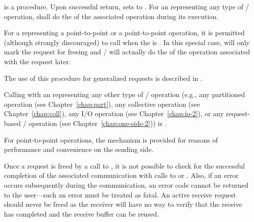  is a  procedure. Upon successful return,
 sets  to .
For an   representing any type of \MPI/ operation,
 shall do the  of the associated
operation during its execution.

For a  representing a  point-to-point
or a  point-to-point operation, it is permitted (although
strongly discouraged) to call  when the
 is . In this special case, 
will only mark the request for freeing and \MPI/ will actually do the
 of the operation associated with the request later.

The use of this procedure for generalized requests is described in
.

Calling  with an   representing any
other type of \MPI/ operation (e.g., any partitioned operation (see Chapter~\ref{chap:part}),
any collective operation (see Chapter~\ref{chap:coll}), any I/O
operation (see Chapter~\ref{chap:io-2}), or any
request-based \RMA/ operation (see Chapter~\ref{chap:one-side-2})) is .

\begin{rationale}
For point-to-point operations, the  mechanism is provided for
reasons of performance and convenience on the sending side.
\end{rationale}

\begin{users}
Once a request is freed by a call to , it is not possible
to check for the successful completion of the associated communication
with calls to  or . Also, if an error occurs subsequently
during the communication, an error code cannot be returned to the
user---such an error must be treated as fatal. An active receive request should
never be freed as the receiver will have no way to verify that the receive
has completed and the receive buffer can be reused.
\end{users}


